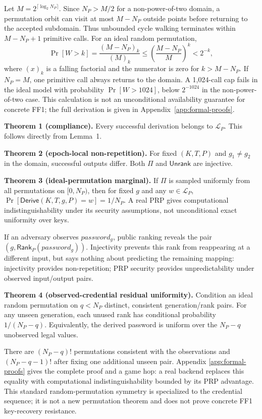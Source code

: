 \documentclass[preprint,12pt]{elsarticle}
\newcommand{\Lang}{\mathcal{L}}
\newcommand{\Rank}{\mathsf{Rank}}
\newcommand{\Unrank}{\mathsf{Unrank}}
\newcommand{\Derive}{\mathsf{Derive}}
\newcommand{\Perm}{\Pi}
\begin{document}
Let $M=2^{\lceil\log_2N_P\rceil}$. Since $N_P>M/2$ for a non-power-of-two
domain, a permutation orbit can visit at most $M-N_P$ outside points before
returning to the accepted subdomain. Thus unbounded cycle walking terminates
within $M-N_P+1$ primitive calls. For an ideal random permutation,
\begin{equation}
\Pr[W>k]=\frac{(M-N_P)_k}{(M)_k}
\le\left(\frac{M-N_P}{M}\right)^k<2^{-k},
\end{equation}
where $(x)_k$ is a falling factorial and the numerator is zero for
$k>M-N_P$. If $N_P=M$, one primitive call always returns to the domain. A
1,024-call cap fails in the ideal model with probability $\Pr[W>1024]$, below
$2^{-1024}$ in the non-power-of-two case. This calculation is not an
unconditional availability guarantee for concrete FF1; the full derivation is
given in Appendix~\ref{app:formal-proofs}.

\textbf{Theorem 1 (compliance).} Every successful derivation belongs to
$\Lang_P$. This follows directly from Lemma~1.

\textbf{Theorem 2 (epoch-local non-repetition).} For fixed $(K,T,P)$ and
$g_1\ne g_2$ in the domain, successful outputs differ. Both $\Perm$ and
$\Unrank$ are injective.

\textbf{Theorem 3 (ideal-permutation marginal).} If $\Perm$ is sampled
uniformly from all permutations on $[0,N_P)$, then for fixed $g$ and any
$w\in\Lang_P$,
$\Pr[\Derive(K,T,g,P)=w]=1/N_P$. A real PRP gives computational
indistinguishability under its security assumptions, not unconditional exact
uniformity over keys.

If an adversary observes $password_g$, public ranking reveals the pair
$(g,\Rank_P(password_g))$. Injectivity prevents this rank from reappearing at a
different input, but says nothing about predicting the remaining mapping:
injectivity provides non-repetition; PRP security provides unpredictability
under observed input/output pairs.

\textbf{Theorem 4 (observed-credential residual uniformity).} Condition an
ideal random permutation on $q<N_P$ distinct, consistent generation/rank pairs.
For any unseen generation, each unused rank has conditional probability
$1/(N_P-q)$. Equivalently, the derived password is uniform over the
$N_P-q$ unobserved legal values.

There are $(N_P-q)!$ permutations consistent with the observations and
$(N_P-q-1)!$ after fixing one additional unseen pair. Appendix
\ref{app:formal-proofs} gives the complete proof and a game hop: a real
backend replaces this equality with computational indistinguishability bounded
by its PRP advantage. This standard random-permutation symmetry is specialized
to the credential sequence; it is not a new permutation theorem and does not
prove concrete FF1 key-recovery resistance.
\end{document}
